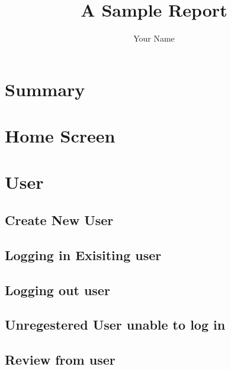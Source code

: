 \documentclass[a4paper,12pt]{article} %
\title{A Sample Report}
\author{Your Name}
\begin{document}
	
	\pagestyle{plain}
	\tableofcontents
	
	\newpage
	\pagestyle{fancy} %
	\setcounter{page}{1}
	
	\renewcommand{\thesection}{} %
	\titleformat{\section}[hang]{\Large\bfseries}{}{0ex}{}{} %
		\setcounter{section}{0}
	\section{Summary}

\section{Home Screen}



\section{ User}

\subsection{Create New User}

\subsection{Logging in Exisiting user}

\subsection{Logging out user}

\subsection{Unregestered User unable to log in}

\subsection{Review from user}
\end{document}

